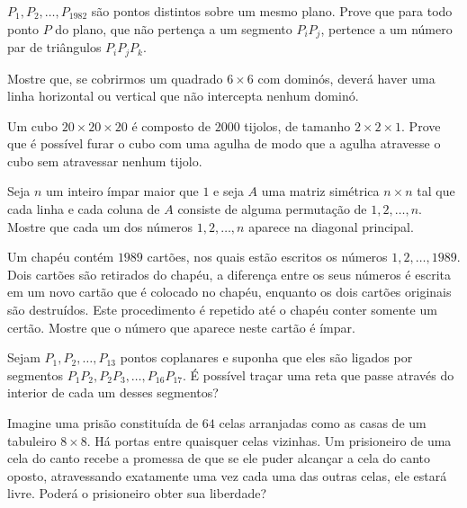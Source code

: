 \begin{questao}
  $P_1,P_2,\ldots,P_{1982}$ são pontos distintos sobre um mesmo plano. Prove que
  para todo ponto $P$ do plano, que não pertença a um segmento $P_iP_j$,
  pertence a um número par de triângulos $P_iP_jP_k$.
\end{questao}

\begin{questao}
  Mostre que, se cobrirmos um quadrado $6 \times 6$ com dominós, deverá haver
  uma linha horizontal ou vertical que não intercepta nenhum dominó.
\end{questao}

\begin{questao}
  Um cubo $20 \times 20 \times 20$ é composto de $2000$ tijolos, de tamanho $2
  \times 2 \times 1$. Prove que é possível furar o cubo com uma agulha de modo
  que a agulha atravesse o cubo sem atravessar nenhum tijolo.
\end{questao}

\begin{questao}
  Seja $n$ um inteiro ímpar maior que $1$ e seja $A$ uma matriz simétrica $n
  \times n$ tal que cada linha e cada coluna de $A$ consiste de alguma
  permutação de $1,2,\ldots,n$. Mostre que cada um dos números $1,2,\ldots,n$
  aparece na diagonal principal.
\end{questao}

\begin{questao}
  Um chapéu contém $1989$ cartões, nos quais estão escritos os números
  $1,2,\ldots,1989$. Dois cartões são retirados do chapéu, a diferença entre os
  seus números é escrita em um novo cartão que é colocado no chapéu, enquanto os
  dois cartões originais são destruídos. Este procedimento é repetido até o
  chapéu conter somente um certão. Mostre que o número que aparece neste cartão
  é ímpar.
\end{questao}

\begin{questao}
  Sejam $P_1,P_2,\ldots,P_{13}$ pontos coplanares e suponha que eles são ligados
  por segmentos $P_1P_2,P_2P_3,\ldots,P_{16}P_{17}$. É possível traçar uma reta
  que passe através do interior de cada um desses segmentos?
\end{questao}

\begin{questao}
  Imagine uma prisão constituída de $64$ celas arranjadas como as casas de um
  tabuleiro $8 \times 8$. Há portas entre quaisquer celas vizinhas. Um
  prisioneiro de uma cela do canto recebe a promessa de que se ele puder
  alcançar a cela do canto oposto, atravessando exatamente uma vez cada uma das
  outras celas, ele estará livre. Poderá o prisioneiro obter sua liberdade?
\end{questao}

